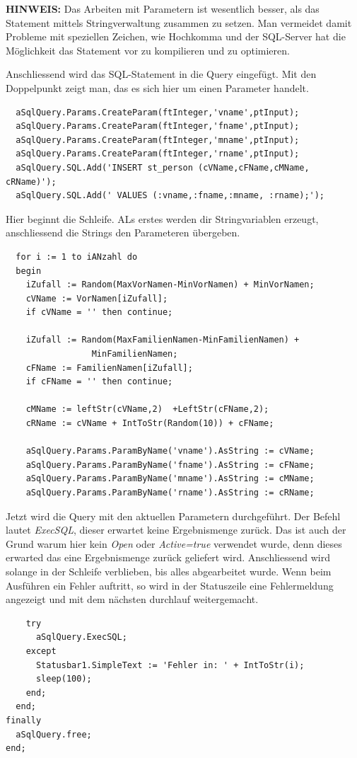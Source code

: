 \textbf{HINWEIS:} Das Arbeiten mit Parametern ist wesentlich besser, als das Statement mittels Stringverwaltung zusammen zu setzen. Man vermeidet damit Probleme mit speziellen Zeichen, wie Hochkomma und der SQL-Server hat die Möglichkeit das Statement vor zu kompilieren und zu optimieren.

Anschliessend wird das SQL-Statement in die Query eingefügt. Mit den Doppelpunkt zeigt man, das es sich hier um einen Parameter handelt. 
\begin{verbatim}
  aSqlQuery.Params.CreateParam(ftInteger,'vname',ptInput);
  aSqlQuery.Params.CreateParam(ftInteger,'fname',ptInput);
  aSqlQuery.Params.CreateParam(ftInteger,'mname',ptInput);
  aSqlQuery.Params.CreateParam(ftInteger,'rname',ptInput);
  aSqlQuery.SQL.Add('INSERT st_person (cVName,cFName,cMName, cRName)');
  aSqlQuery.SQL.Add(' VALUES (:vname,:fname,:mname, :rname);');
\end{verbatim}
Hier beginnt die Schleife. ALs erstes werden dir Stringvariablen erzeugt, anschliessend die Strings den Parameteren übergeben.
\begin{verbatim}
  for i := 1 to iANzahl do
  begin
    iZufall := Random(MaxVorNamen-MinVorNamen) + MinVorNamen;
    cVName := VorNamen[iZufall];
    if cVName = '' then continue;

    iZufall := Random(MaxFamilienNamen-MinFamilienNamen) + 
                 MinFamilienNamen;
    cFName := FamilienNamen[iZufall];
    if cFName = '' then continue;

    cMName := leftStr(cVName,2)  +LeftStr(cFName,2);
    cRName := cVName + IntToStr(Random(10)) + cFName;

    aSqlQuery.Params.ParamByName('vname').AsString := cVName;
    aSqlQuery.Params.ParamByName('fname').AsString := cFName;
    aSqlQuery.Params.ParamByName('mname').AsString := cMName;
    aSqlQuery.Params.ParamByName('rname').AsString := cRName;
\end{verbatim}
Jetzt wird die Query mit den aktuellen Parametern durchgeführt. Der Befehl lautet \emph{ExecSQL}, dieser erwartet keine Ergebnismenge zurück. Das ist auch der Grund warum hier kein \emph{Open} oder \emph{Active=true} verwendet wurde, denn dieses erwarted das eine Ergebnismenge zurück geliefert wird. Anschliessend wird solange in der Schleife verblieben, bis alles abgearbeitet wurde. Wenn beim Ausführen ein Fehler auftritt, so wird in der Statuszeile eine Fehlermeldung angezeigt und mit dem nächsten durchlauf weitergemacht.
\begin{verbatim}
    try
      aSqlQuery.ExecSQL;
    except
      Statusbar1.SimpleText := 'Fehler in: ' + IntToStr(i);
      sleep(100);
    end;
  end;
finally
  aSqlQuery.free;
end;
\end{verbatim}

